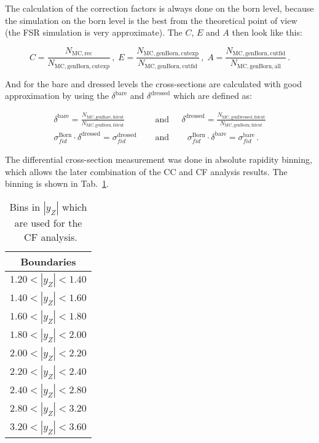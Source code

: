 The calculation of the correction factors is always done on the born level, because the simulation on the born level is the best from the theoretical point of view (the FSR simulation is very approximate). The $C$, $E$ and $A$ then look like this:

\begin{equation}
C = \frac{N_\mathrm{MC, rec}}{N_\mathrm{MC, genBorn, cutexp}}\,, \;
E = \frac{N_\mathrm{MC, genBorn, cutexp}}{N_\mathrm{MC, genBorn, cutfid}}\,, \;
A = \frac{N_\mathrm{MC, genBorn, cutfid}}{N_\mathrm{MC, genBorn, all}}\,.
\end{equation}

And for the bare and dressed levels the cross-sections are calculated with good approximation by using the $\delta^\mathrm{bare}$ and $\delta^\mathrm{dressed}$ which are defined as:

\begin{eqnarray}
  \delta^\mathrm{bare} = \frac{N_\mathrm{MC, genBare, fidcut}}{N_\mathrm{MC, genBorn, fidcut}}\:\:\:&\mbox{and}&\:\:\:
  \delta^\mathrm{dressed} = \frac{N_\mathrm{MC, genDressed, fidcut}}{N_\mathrm{MC, genBorn, fidcut}}\\
  \sigma_{fid}^\mathrm{Born} \cdot \delta^\mathrm{dressed} =
  \sigma_{fid}^\mathrm{dressed} \:\:\:\:\:\:&\mbox{and}&\:\:\:\:\:\: \sigma_{fid}^\mathrm{Born} \cdot \delta^\mathrm{bare} =
  \sigma_{fid}^\mathrm{bare}\,.
\end{eqnarray}


The differential cross-section measurement was done in absolute rapidity binning, which allows the later combination of the CC and CF analysis results. The binning is shown in Tab.~\ref{tab:ZeeCS_bins}.

\begin{table}
\centering
\begin{tabular}{c}
\hline\hline
Boundaries\\\hline
$1.20 < |y_{Z}| <1.40$\\
$1.40 < |y_{Z}| <1.60$\\
$1.60 < |y_{Z}| <1.80$\\
$1.80 < |y_{Z}| <2.00$\\
$2.00 < |y_{Z}| <2.20$\\
$2.20 < |y_{Z}| <2.40$\\
$2.40 < |y_{Z}| <2.80$\\
$2.80 < |y_{Z}| <3.20$\\
$3.20 < |y_{Z}| <3.60$\\
\hline\hline
\end{tabular}
\caption{Bins in $|y_{Z}|$ which are used for the \Zee\ CF analysis.}
\label{tab:ZeeCS_bins}
\end{table}
